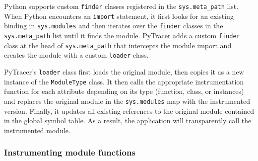 \documentclass[11pt]{article}
\newcommand{\tristan}[1]{\color{orange}\textbf{From Tristan:} #1\color{black}\xspace}
\newcommand{\Yohan}[1]{\color{green!75!black}\textbf{Yohan:} #1\color{black}\xspace}
\newcommand{\pytracer}[0]{PyTracer\xspace}
\begin{document}
Python supports custom \texttt{finder} classes registered in the \texttt{sys.meta\_path} list.
When Python encounters an \texttt{import} statement, it first looks for an existing binding in \texttt{sys.modules} and then iterates over the \texttt{finder} classes in the \texttt{sys.meta\_path} list until it finds the module. \pytracer adds a custom \texttt{finder} class at the head of \texttt{sys.meta\_path} that intercepts
the module import and creates the module with a custom \texttt{loader} class.

\pytracer's \texttt{loader} class first loads the original module, then copies it as a new instance of the \texttt{ModuleType} class. It then calls the appropriate instrumentation function for each attribute depending on its type (function, class, or instances) and replaces the original module in the \texttt{sys.modules} map with the instrumented version. Finally, it updates all existing references to the original module contained in the global symbol table.
As a result, the application will transparently call the instrumented module.



\subsubsection{Instrumenting module functions}
\end{document}

